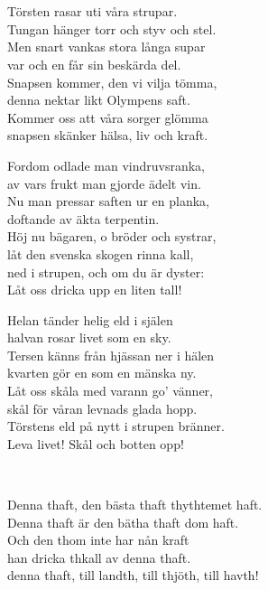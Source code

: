 \\

\newpage 


 \\       

\songtext{}
Törsten rasar uti våra strupar.\\
Tungan hänger torr och styv och stel.\\
Men snart vankas stora långa supar\\
var och en får sin beskärda del.\\
Snapsen kommer, den vi vilja tömma,\\
denna nektar likt Olympens saft.\\
Kommer oss att våra sorger glömma\\
snapsen skänker hälsa, liv och kraft.

Fordom odlade man vindruvsranka,\\
av vars frukt man gjorde ädelt vin.\\
Nu man pressar saften ur en planka,\\
doftande av äkta terpentin.\\
Höj nu bägaren, o bröder och systrar,\\
låt den svenska skogen rinna kall,\\
ned i strupen, och om du är dyster:\\
Låt oss dricka upp en liten tall!

Helan tänder helig eld i själen\\
halvan rosar livet som en sky.\\
Tersen känns från hjässan ner i hälen\\
kvarten gör en som en mänska ny.\\
Låt oss skåla med varann go' vänner,\\
skål för våran levnads glada hopp.\\
Törstens eld på nytt i strupen bränner.\\
Leva livet! Skål och botten opp!

\newpage 


 \\       

\songtext{}
Denna thaft, den bästa thaft thythtemet haft. \\
Denna thaft är den bätha thaft dom haft. \\
Och den thom inte har nån kraft \\
han dricka thkall av denna thaft. \\
denna thaft, till landth, till thjöth, till havth! \\

